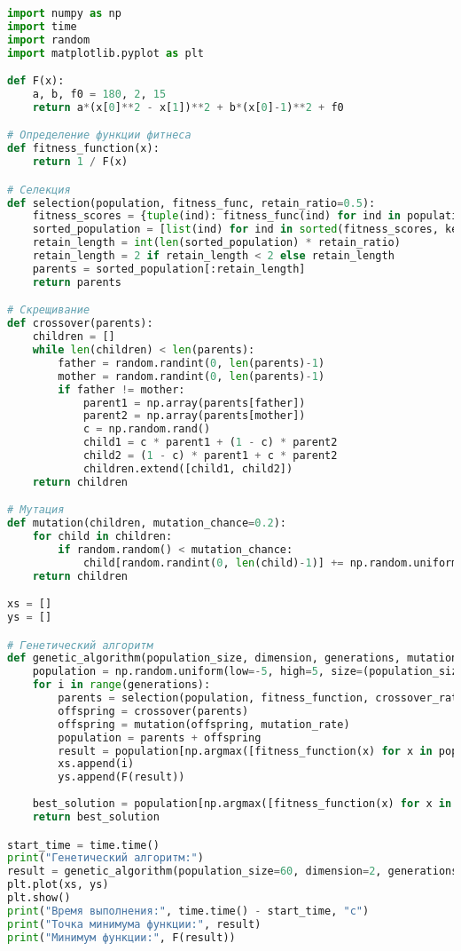 \documentclass[a4paper, 14pt]{extarticle}
\begin{document}
\begin{lstlisting}[language=Python,caption={Генетический алгоритм},label={lst:code6}]
import numpy as np
import time
import random
import matplotlib.pyplot as plt

def F(x):
    a, b, f0 = 180, 2, 15
    return a*(x[0]**2 - x[1])**2 + b*(x[0]-1)**2 + f0

# Определение функции фитнеса
def fitness_function(x):
    return 1 / F(x)

# Селекция
def selection(population, fitness_func, retain_ratio=0.5):
    fitness_scores = {tuple(ind): fitness_func(ind) for ind in population}
    sorted_population = [list(ind) for ind in sorted(fitness_scores, key=fitness_scores.get, reverse=True)]
    retain_length = int(len(sorted_population) * retain_ratio)
    retain_length = 2 if retain_length < 2 else retain_length
    parents = sorted_population[:retain_length]
    return parents

# Скрещивание
def crossover(parents):
    children = []
    while len(children) < len(parents):
        father = random.randint(0, len(parents)-1)
        mother = random.randint(0, len(parents)-1)
        if father != mother:
            parent1 = np.array(parents[father])
            parent2 = np.array(parents[mother])
            c = np.random.rand()
            child1 = c * parent1 + (1 - c) * parent2
            child2 = (1 - c) * parent1 + c * parent2
            children.extend([child1, child2])
    return children

# Мутация
def mutation(children, mutation_chance=0.2):
    for child in children:
        if random.random() < mutation_chance:
            child[random.randint(0, len(child)-1)] += np.random.uniform(-0.5, 0.5)
    return children

xs = []
ys = []

# Генетический алгоритм
def genetic_algorithm(population_size, dimension, generations, mutation_rate, crossover_rate):
    population = np.random.uniform(low=-5, high=5, size=(population_size, dimension))
    for i in range(generations):
        parents = selection(population, fitness_function, crossover_rate)
        offspring = crossover(parents)
        offspring = mutation(offspring, mutation_rate)
        population = parents + offspring
        result = population[np.argmax([fitness_function(x) for x in population])]
        xs.append(i)
        ys.append(F(result))
    
    best_solution = population[np.argmax([fitness_function(x) for x in population])]
    return best_solution

start_time = time.time()
print("Генетический алгоритм:")
result = genetic_algorithm(population_size=60, dimension=2, generations=50, mutation_rate=0.15, crossover_rate=0.5)
plt.plot(xs, ys)
plt.show()
print("Время выполнения:", time.time() - start_time, "c")
print("Точка минимума функции:", result)
print("Минимум функции:", F(result))
\end{lstlisting}
\end{document}
